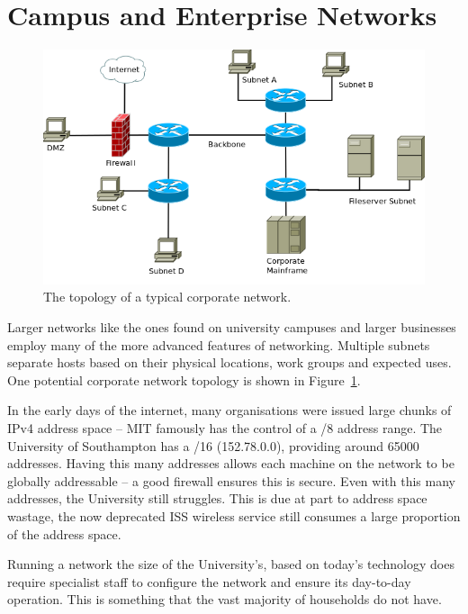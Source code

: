 \documentclass[12pt,a4paper,twoside]{report}
\begin{document}
\section{Campus and Enterprise Networks}
\begin{figure}
\begin{center}
	\includegraphics[width=\linewidth]{../Diagrams/Network/CorporateNetwork.png}
	\caption{The topology of a typical corporate network.}\label{fig:corporate_net}
\end{center}
\end{figure}
Larger networks like the ones found on university campuses and larger
businesses employ many of the more advanced features of networking.  Multiple
subnets separate hosts based on their physical locations, work groups and
expected uses. One potential corporate network topology is shown in
Figure~\ref{fig:corporate_net}.

In the early days of the internet, many organisations were issued large chunks
of IPv4 address space -- MIT famously has the control of a /8 address
range\cite{IPv4IANA}. The University of Southampton has a /16 (152.78.0.0),
providing around 65000 addresses. Having this many addresses allows each
machine on the network to be globally addressable -- a good firewall ensures
this is secure.  Even with this many addresses, the University still struggles.
This is due at part to address space wastage, the now deprecated ISS wireless
service still consumes a large proportion of the address space.

Running a network the size of the University's, based on today's technology
does require specialist staff to configure the network and ensure its
day-to-day operation. This is something that the vast majority of households do
not have.
\end{document}
